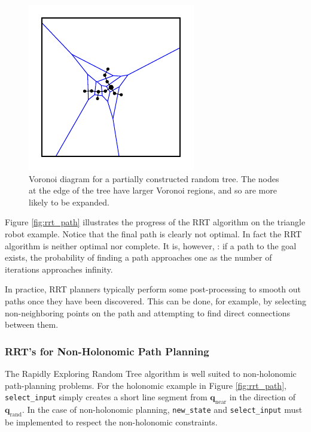\begin{figure}
\begin{center}
\includegraphics[]{planning/figs/rrt_prm/rrt_vor_0009_D.pdf}
\end{center}
\caption{Voronoi diagram for a partially constructed random tree.  The
  nodes at the edge of the tree have larger Voronoi regions, and so
  are more likely to be expanded. }
\label{fig:voronoi}
\end{figure}


Figure \ref{fig:rrt_path} illustrates the progress of the RRT
algorithm on the triangle robot example.  Notice that the final path
is clearly not optimal.  In fact the RRT algorithm is neither optimal
nor complete.  It is, however, : if a
path to the goal exists, the probability of finding a path approaches
one as the number of iterations approaches infinity.

In practice, RRT planners typically perform some post-processing to
smooth out paths once they have been discovered.  This can be done,
for example, by selecting non-neighboring points on the path and
attempting to find direct connections between them.

\subsubsection{RRT's for Non-Holonomic Path Planning}

The Rapidly Exploring Random Tree algorithm is well suited to
non-holonomic path-planning problems.  For the holonomic example in
Figure \ref{fig:rrt_path}, \verb+select_input+ simply creates a short
line segment from $\mathbf{q}_{\text{near}}$ in the direction of
$\mathbf{q}_{\text{rand}}$.  In the case of non-holonomic planning,
\verb+new_state+ and \verb+select_input+ must be implemented to
respect the non-holonomic constraints.


